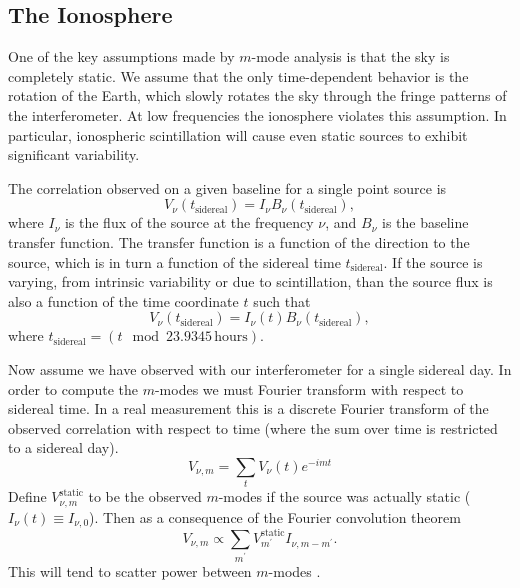 \documentclass[twocolumn]{aastex61}
\newcommand{\todo}[1]{\textcolor{red}{TODO: #1}\PackageWarning{TODO:}{#1!}}
\begin{document}

\subsection{The Ionosphere}

One of the key assumptions made by $m$-mode analysis is that the sky is completely static.  We
assume that the only time-dependent behavior is the rotation of the Earth, which slowly rotates the
sky through the fringe patterns of the interferometer. At low frequencies the ionosphere violates
this assumption. In particular, ionospheric scintillation will cause even static sources to exhibit
significant variability.

The correlation observed on a given baseline for a single point source is
\begin{equation}
    V_\nu(t_{\textrm{sidereal}}) = I_\nu B_\nu(t_{\textrm{sidereal}}),
\end{equation}
where $I_\nu$ is the flux of the source at the frequency $\nu$, and $B_\nu$ is the baseline transfer
function. The transfer function is a function of the direction to the source, which is in turn a
function of the sidereal time $t_{\textrm{sidereal}}$. If the source is varying, from intrinsic
variability or due to scintillation, than the source flux is also a function of the time coordinate
$t$ such that
\begin{equation}
    V_\nu(t_{\textrm{sidereal}}) = I_\nu(t) B_\nu(t_{\textrm{sidereal}}),
\end{equation}
where $t_{\textrm{sidereal}} = (t \mod 23.9345\,\textrm{hours})$.

Now assume we have observed with our interferometer for a single sidereal day.  In order to compute
the $m$-modes we must Fourier transform with respect to sidereal time. In a real measurement this is
a discrete Fourier transform of the observed correlation with respect to time (where the sum over
time is restricted to a sidereal day).
\begin{equation}
    V_{\nu, m} = \sum_{t} V_\nu(t) e^{-imt}
\end{equation}
Define $V_{\nu, m}^{\textrm{static}}$ to be the observed $m$-modes if the source was actually static
($I_\nu(t) \equiv I_{\nu,0}$). Then as a consequence of the Fourier convolution theorem
\begin{equation}
    V_{\nu, m} \propto \sum_{m^\prime} V_{m^\prime}^\textrm{static} I_{\nu, m-m^\prime}.
\end{equation}
This will tend to scatter power between $m$-modes \citep{richard_ionosphere_thoughts}.
\end{document}
